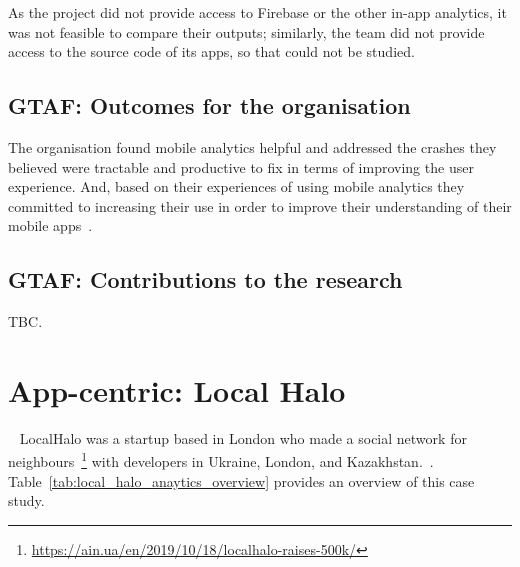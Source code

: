 As the project did not provide access to Firebase or the other in-app analytics, it was not feasible to compare their outputs; similarly, the team did not provide access to the source code of its apps, so that could not be studied.


\subsection{GTAF: Outcomes for the organisation}
The organisation found mobile analytics helpful and addressed the crashes they believed were tractable and productive to fix in terms of improving the user experience. And, based on their experiences of using mobile analytics they committed to increasing their use in order to improve their understanding of their mobile apps~.


\subsection{GTAF: Contributions to the research}
TBC.


\clearpage


\section{App-centric: Local Halo}~\label{case-study-overview-localhalo}
LocalHalo was a startup based in London who made a social network for neighbours~\footnote{\url{https://ain.ua/en/2019/10/18/localhalo-raises-500k/}} with developers in Ukraine, London, and Kazakhstan.~. 
Table~\ref{tab:local_halo_anaytics_overview} provides an overview of this case study.

